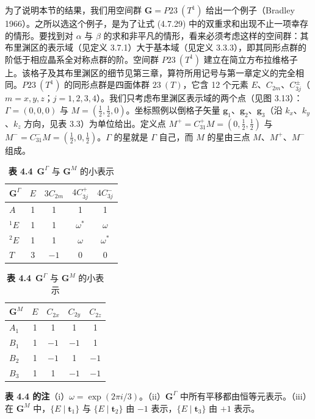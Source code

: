 为了说明本节的结果，我们用空间群 $\mathbf{G} = P23\ (T^{1})$ 给出一个例子（Bradley 1966）。之所以选这个例子，是为了让式 (4.7.29) 中的双重求和出现不止一项幸存的情形。要找到对 $\alpha$ 与 $\beta$ 的求和非平凡的情形，看来必须考虑这样的空间群：其布里渊区的表示域（见定义 3.7.1）大于基本域（见定义 3.3.3），即其同形点群的阶低于相应晶系全对称点群的阶。空间群 $P23\ (T^{1})$ 建立在简立方布拉维格子上。该格子及其布里渊区的细节见第三章，算符所用记号与第一章定义的完全相同。$P23\ (T^{1})$ 的同形点群是四面体群 $23\ (T)$，它含 12 个元素 $E$、$C_{2m}$、$C^{\pm}_{3j}$（$m = x, y, z$；$j = 1, 2, 3, 4$）。我们只考虑布里渊区表示域的两个点（见图 3.13）：$\Gamma = (0, 0, 0)$ 与 $M = (\frac{1}{2}, \frac{1}{2}, 0)$。坐标照例以倒格子矢量 $\mathbf{g}_{1}$、$\mathbf{g}_{2}$、$\mathbf{g}_{3}$（沿 $k_{x}$、$k_{y}$、$k_{z}$ 方向，见表 3.3）为单位给出。定义点 $M^{+} = C^{+}_{31}M = (0, \frac{1}{2}, \frac{1}{2})$ 与 $M^{-} = C^{-}_{31}M = (\frac{1}{2}, 0, \frac{1}{2})$。$\Gamma$ 的星就是 $\Gamma$ 自己，而 $M$ 的星由三点 $M$、$M^{+}$、$M^{-}$ 组成。

\begin{table}[H]
\centering
\caption*{\textbf{表 4.4}\ $\mathbf{G}^{\Gamma}$ 与 $\mathbf{G}^{M}$ 的小表示}
\begin{tabular}{@{}lcccc@{}}
\toprule
$\mathbf{G}^{\Gamma}$ & $E$ & $3C_{2m}$ & $4C^{+}_{3j}$ & $4C^{-}_{3j}$\\
\midrule
$A$ & 1 & 1 & 1 & 1\\
${}^{1}E$ & 1 & 1 & $\omega^{*}$ & $\omega$\\
${}^{2}E$ & 1 & 1 & $\omega$ & $\omega^{*}$\\
$T$ & 3 & $-1$ & 0 & 0\\
\bottomrule
\end{tabular}
\quad
\begin{tabular}{@{}lcccc@{}}
\toprule
$\mathbf{G}^{M}$ & $E$ & $C_{2x}$ & $C_{2y}$ & $C_{2z}$\\
\midrule
$A_{1}$ & 1 & 1 & 1 & 1\\
$B_{1}$ & 1 & $-1$ & $-1$ & 1\\
$B_{2}$ & 1 & $-1$ & 1 & $-1$\\
$B_{3}$ & 1 & 1 & $-1$ & $-1$\\
\bottomrule
\end{tabular}
\end{table}

\noindent\textbf{表 4.4 的注}\quad（i）$\omega = \exp(2\pi i/3)$。（ii）$\mathbf{G}^{\Gamma}$ 中所有平移都由恒等元表示。（iii）在 $\mathbf{G}^{M}$ 中，$\{E \mid \mathbf{t}_{1}\}$ 与 $\{E \mid \mathbf{t}_{2}\}$ 由 $-1$ 表示，$\{E \mid \mathbf{t}_{3}\}$ 由 $+1$ 表示。

